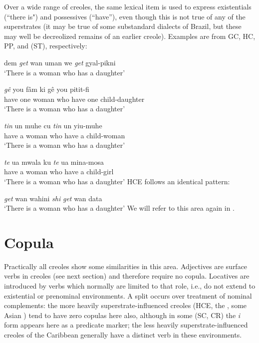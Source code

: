 Over a wide range of creoles, the same lexical item is used to express existentials (``there is") and possessives (``have''), even though this is not true of any of the superstrates (it may be true of some substandard  dialects of Brazil, but these may well be decreolized remains of an earlier creole). Examples are from GC, HC, PP, and  (ST), respectively:

\ea\label{ex:2:55}
 dem \textit{get} wan uman we \textit{get} gyal-pikni \\
\glt `There is a woman who has a daughter'
\z

\ea\label{ex:2:56}
\gll \emph{gê} you f{\^a}m ki gê you pitit-fi\\
have one woman who have one child-daughter\\
\glt `There is a woman who has a daughter'
\z

\ea\label{ex:2:57}
\gll \emph{tin} un muhe cu \emph{tin} un yiu-muhe\\
have a woman who have a child-woman \\
\glt `There is a woman who has a daughter'
\z

\ea\label{ex:2:58}
 \gll \emph{te} ua mwala ku \emph{te} ua mina-mosa \\
have a woman who have a child-girl\\
\glt `There is a woman who has a daughter'
\z
HCE follows an identical pattern:

\ea\label{ex:2:59}
 \textit{get} wan wahini \textit{shi} \textit{get} wan data\\
\glt `There is a woman who has a daughter' 
\z
We will refer to this area again in .

\section{Copula}

Practically all creoles show some similarities in this area. Adjec\-tives are surface verbs in creoles (see next section) and therefore require no copula. Locatives are introduced by verbs which normally are limited to that role, i.e., do not extend to existential or prenominal environments. A split occurs over treatment of nominal complements: the more heavily superstrate-influenced creoles (HCE, the , some Asian ) tend to have zero copulas here also, although in some (SC, CR) the \textit{i} form appears here as a predicate marker; the less heavily superstrate-influenced creoles of the Caribbean generally have a distinct verb in these environments.

